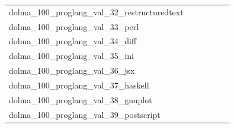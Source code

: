 \documentclass[dvipsnames]{article}
\begin{document}
\begin{appendix}
{\begin{longtable}{m{6cm}m{1.7cm}m{1.7cm}m{1.7cm}m{1.7cm}m{1.7cm}}
	dolma\_100\_proglang\_val\_32\_restructuredtext  & \colorbox[HTML]{d3eda0}{\makebox[\mywidth][c]{4.01}} & \colorbox[HTML]{e7f5ad}{\makebox[\mywidth][c]{4.05}} & \colorbox[HTML]{ffffe5}{\makebox[\mywidth][c]{4.66}} & \colorbox[HTML]{b6e092}{\makebox[\mywidth][c]{3.97}} & \colorbox[HTML]{77c578}{\makebox[\mywidth][c]{3.92}}\\
	dolma\_100\_proglang\_val\_33\_perl  & \colorbox[HTML]{93d183}{\makebox[\mywidth][c]{2.57}} & \colorbox[HTML]{e0f2a8}{\makebox[\mywidth][c]{2.62}} & \colorbox[HTML]{ffffe5}{\makebox[\mywidth][c]{3.01}} & \colorbox[HTML]{b8e293}{\makebox[\mywidth][c]{2.59}} & \colorbox[HTML]{77c578}{\makebox[\mywidth][c]{2.55}}\\
	dolma\_100\_proglang\_val\_34\_diff  & \colorbox[HTML]{98d485}{\makebox[\mywidth][c]{2.87}} & \colorbox[HTML]{e4f4ab}{\makebox[\mywidth][c]{2.95}} & \colorbox[HTML]{ffffe5}{\makebox[\mywidth][c]{3.43}} & \colorbox[HTML]{afdd8f}{\makebox[\mywidth][c]{2.89}} & \colorbox[HTML]{77c578}{\makebox[\mywidth][c]{2.86}}\\
	dolma\_100\_proglang\_val\_35\_ini  & \colorbox[HTML]{77c578}{\makebox[\mywidth][c]{3.91}} & \colorbox[HTML]{f7fcba}{\makebox[\mywidth][c]{4.16}} & \colorbox[HTML]{ffffe5}{\makebox[\mywidth][c]{4.90}} & \colorbox[HTML]{dcf1a5}{\makebox[\mywidth][c]{4.05}} & \colorbox[HTML]{b3df91}{\makebox[\mywidth][c]{3.98}}\\
	dolma\_100\_proglang\_val\_36\_jsx  & \colorbox[HTML]{d7efa2}{\makebox[\mywidth][c]{1.83}} & \colorbox[HTML]{ddf1a6}{\makebox[\mywidth][c]{1.84}} & \colorbox[HTML]{ffffe5}{\makebox[\mywidth][c]{1.95}} & \colorbox[HTML]{c5e799}{\makebox[\mywidth][c]{1.83}} & \colorbox[HTML]{77c578}{\makebox[\mywidth][c]{1.82}}\\
	dolma\_100\_proglang\_val\_37\_haskell  & \colorbox[HTML]{77c578}{\makebox[\mywidth][c]{2.94}} & \colorbox[HTML]{e3f4aa}{\makebox[\mywidth][c]{3.07}} & \colorbox[HTML]{ffffe5}{\makebox[\mywidth][c]{3.73}} & \colorbox[HTML]{c5e799}{\makebox[\mywidth][c]{3.02}} & \colorbox[HTML]{7fc97b}{\makebox[\mywidth][c]{2.95}}\\
	dolma\_100\_proglang\_val\_38\_gnuplot  & \colorbox[HTML]{77c578}{\makebox[\mywidth][c]{2.65}} & \colorbox[HTML]{fafdcd}{\makebox[\mywidth][c]{2.88}} & \colorbox[HTML]{ffffe5}{\makebox[\mywidth][c]{3.36}} & \colorbox[HTML]{f4fab6}{\makebox[\mywidth][c]{2.81}} & \colorbox[HTML]{e5f5ac}{\makebox[\mywidth][c]{2.77}}\\
	dolma\_100\_proglang\_val\_39\_postscript  & \colorbox[HTML]{fdfedf}{\makebox[\mywidth][c]{19.09}} & \colorbox[HTML]{ffffe5}{\makebox[\mywidth][c]{19.52}} & \colorbox[HTML]{ffffe5}{\makebox[\mywidth][c]{19.56}} & \colorbox[HTML]{8ecf81}{\makebox[\mywidth][c]{18.66}} & \colorbox[HTML]{77c578}{\makebox[\mywidth][c]{18.64}}\\

\end{longtable}}
\end{appendix}
\end{document}
